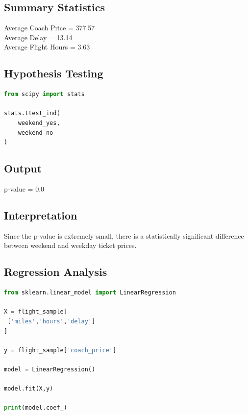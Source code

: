\documentclass[12pt,a4paper]{article}
\begin{document}
\subsection{Summary Statistics}

\begin{tcolorbox}[colback=lightblue]
Average Coach Price = 377.57 \\
Average Delay = 13.14 \\
Average Flight Hours = 3.63
\end{tcolorbox}

\subsection{Hypothesis Testing}

\begin{lstlisting}[language=Python]
from scipy import stats

stats.ttest_ind(
    weekend_yes,
    weekend_no
)
\end{lstlisting}

\subsection{Output}

\begin{tcolorbox}[colback=lightblue]
p-value = 0.0
\end{tcolorbox}

\subsection{Interpretation}

Since the p-value is extremely small, there is a statistically significant difference between weekend and weekday ticket prices.

\subsection{Regression Analysis}

\begin{lstlisting}[language=Python]
from sklearn.linear_model import LinearRegression

X = flight_sample[
 ['miles','hours','delay']
]

y = flight_sample['coach_price']

model = LinearRegression()

model.fit(X,y)

print(model.coef_)
\end{lstlisting}
\end{document}
